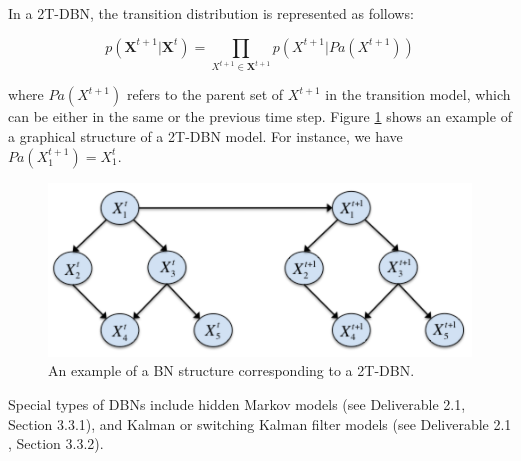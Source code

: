 In a 2T-DBN, the transition distribution is represented as follows:

$$ p(\mathbf{X}^{t+1} |\mathbf{X}^t) = \prod_{X^{t+1}\in \mathbf{X}^{t+1}} p(X^{t+1}|Pa(X^{t+1}))$$ 

\noindent where $Pa(X^{t+1})$ refers to the parent set of $X^{t+1}$ in the transition model, which can be either in the same or the previous time step. Figure \ref{Figure:ExampleDBN} shows an example of a graphical structure of a 2T-DBN model. For instance, we have $Pa(X_1^{t+1}) = X_1^{t}$.

\begin{figure}[ht!]
\begin{center}
\includegraphics[scale=0.6]{./figures/ExampleDBN}
\caption{\label{Figure:ExampleDBN}An example of a BN structure corresponding to a 2T-DBN.}
\end{center}
\end{figure}

Special types of DBNs include hidden Markov models (see Deliverable 2.1\cite{Deliverable2.1}, Section 3.3.1), and Kalman or switching Kalman filter models (see Deliverable 2.1 \cite{Deliverable2.1}, Section 3.3.2).